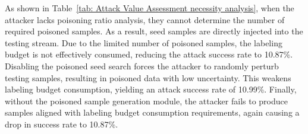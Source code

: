 As shown in Table~\ref{tab: Attack Value Assessment necessity analysis}, when the attacker lacks poisoning ratio analysis, they cannot determine the number of required poisoned samples.
As a result, seed samples are directly injected into the testing stream.
Due to the limited number of poisoned samples, the labeling budget is not effectively consumed, reducing the attack success rate to 10.87\%.
Disabling the poisoned seed search forces the attacker to randomly perturb testing samples, resulting in poisoned data with low uncertainty.
This weakens labeling budget consumption, yielding an attack success rate of 10.99\%.
Finally, without the poisoned sample generation module, the attacker fails to produce samples aligned with labeling budget consumption requirements, again causing a drop in success rate to 10.87\%.